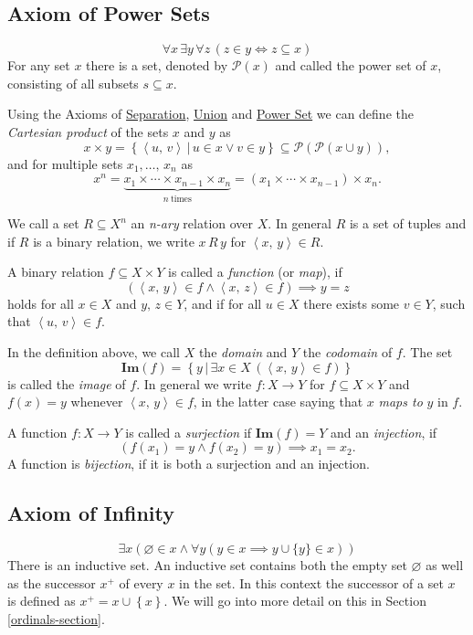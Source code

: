 \documentclass[../../main.tex]{subfiles}
\begin{document}
\subsection{Axiom of Power Sets}\label{ZF6}
$$\forall x\, \exists y\, \forall z\, \left(z \in y \iff z \subseteq x\right)$$
For any set $x$ there is a set, denoted by $\mathcal{P}(x)$ and called the power set of $x$, consisting of all subsets $s \subseteq x$.

Using the Axioms of \hyperref[ZF3]{Separation}, \hyperref[ZF5]{Union} and \hyperref[ZF6]{Power Set} we can define the \textit{Cartesian product} of the sets $x$ and $y$ as
$$x \times y = \left\{\left<u,\, v\right> \,\vert\, u \in x \vee v \in y\right\} \subseteq \mathcal{P}\left(\mathcal{P}\left(x \cup y\right)\right),$$
and for multiple sets $x_1,\ldots,\, x_n$ as
$$x^n = \underbrace{x_1 \times \cdots \times x_{n-1} \times x_n}_{n\ \text{times}}  = \left(x_1 \times \cdots \times x_{n-1}\right) \times x_n.$$

We call a set $R \subseteq X^n$ an \textit{n-ary} relation over $X$.
In general $R$ is a set of tuples and if $R$ is a binary relation, we write $x\, R\, y$ for $\left<x,\, y\right> \in R$.

A binary relation $f \subseteq X \times Y$ is called a \textit{function} (or \textit{map}), if
$$\left(\left<x,\, y\right> \in f \wedge \left<x,\, z\right> \in f\right) \implies y = z$$
holds for all $x \in X$ and $y,\, z \in Y$, and if for all $u \in X$ there exists some $v \in Y$, such that $\left<u,\, v\right> \in f$.

In the definition above, we call $X$ the \textit{domain} and $Y$ the \textit{codomain} of $f$.
The set
$$\mathbf{Im}(f) = \left\{y \,\vert\, \exists x \in X \, \left(\left<x,\, y\right> \in f\right)\right\}$$
is called the \textit{image} of $f$. 
In general we write $f: X \to Y$ for $f \subseteq X \times Y$ and $f(x) = y$ whenever $\left<x,\, y\right> \in f$, in the latter case saying that $x$ \textit{maps to} $y$ in $f$.

A function $f: X \to Y$ is called a \textit{surjection} if $\mathbf{Im}(f) = Y$
and an \textit{injection}, if $$\left(f(x_1) = y \wedge f(x_2) = y\right) \implies x_1 = x_2.$$ 
A function is \textit{bijection}, if it is both a surjection and an injection. \cite[pp.7-10]{Jec78}

\subsection{Axiom of Infinity} \label{ZF7}
$$\exists x \left(\varnothing \in x \wedge \forall y \left(y \in x \implies y \cup \{y\} \in x \right)\right)$$
There is an inductive set.
An inductive set contains both the empty set $\varnothing$ as well as the successor $x^+$ of every $x$ in the set.
In this context the successor of a set $x$ is defined as $x^+ = x \cup \left\{x\right\}$.
We will go into more detail on this in Section \ref{ordinals-section}.
\end{document}
